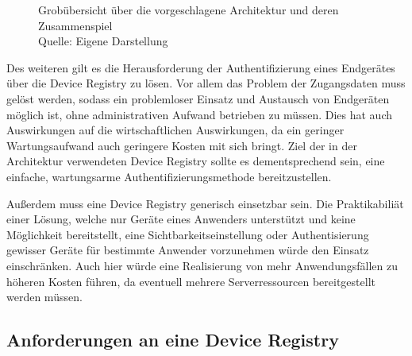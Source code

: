 \begin{figure}
    \centering
    \caption{Grobübersicht über die vorgeschlagene Architektur und deren Zusammenspiel\\ Quelle: Eigene Darstellung}
    \label{fig:high_level}
\end{figure}

Des weiteren gilt es die Herausforderung der Authentifizierung eines Endgerätes über die Device Registry zu lösen. Vor allem das Problem der Zugangsdaten muss gelöst werden, sodass ein problemloser Einsatz und Austausch von Endgeräten möglich ist, ohne administrativen Aufwand betrieben zu müssen. Dies hat auch Auswirkungen auf die wirtschaftlichen Auswirkungen, da ein geringer Wartungsaufwand auch geringere Kosten mit sich bringt. Ziel der in der Architektur verwendeten Device Registry sollte es dementsprechend sein, eine einfache, wartungsarme Authentifizierungsmethode bereitzustellen.

Außerdem muss eine Device Registry generisch einsetzbar sein. Die Praktikabiliät einer Lösung, welche nur Geräte eines Anwenders unterstützt und keine Möglichkeit bereitstellt, eine Sichtbarkeitseinstellung oder Authentisierung gewisser Geräte für bestimmte Anwender vorzunehmen würde den Einsatz einschränken. Auch hier würde eine Realisierung von mehr Anwendungsfällen zu höheren Kosten führen, da eventuell mehrere Serverressourcen bereitgestellt werden müssen.

\subsection*{Anforderungen an eine Device Registry}

